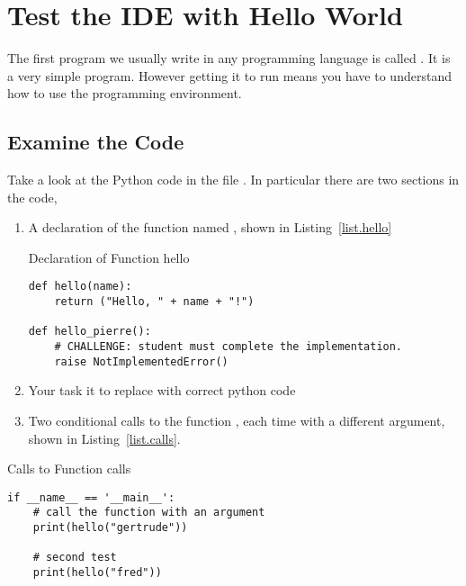 \section{Test the IDE with Hello World}
\label{sec.hello.world}

The first program we usually write in any programming language is
called .  It is a very simple program.  However
getting it to run means you have to understand how to use the
programming environment.

\subsection{Examine the Code}
\label{sec.examine.the.code}
Take a look at the Python code in the file .  In
particular there are two sections in the code,
\begin{enumerate}
\item A declaration of the function named , shown in
  Listing~\ref{list.hello}

\begin{listing}{Declaration of Function }{hello}
\begin{minipage}[c]{0.95\textwidth}\begin{lstlisting}
def hello(name):
    return ("Hello, " + name + "!")

def hello_pierre():
    # CHALLENGE: student must complete the implementation.
    raise NotImplementedError()
\end{lstlisting}\end{minipage}\end{listing}

\item Your task it to replace  with correct python code 
\item Two conditional calls to the function , each time
  with a different argument, shown in Listing~\ref{list.calls}.
\end{enumerate}

\begin{listing}{Calls to Function }{calls}
\begin{minipage}[c]{0.95\textwidth}\begin{lstlisting}
if __name__ == '__main__':
    # call the function with an argument
    print(hello("gertrude"))
    
    # second test
    print(hello("fred"))
\end{lstlisting}\end{minipage}\end{listing}


